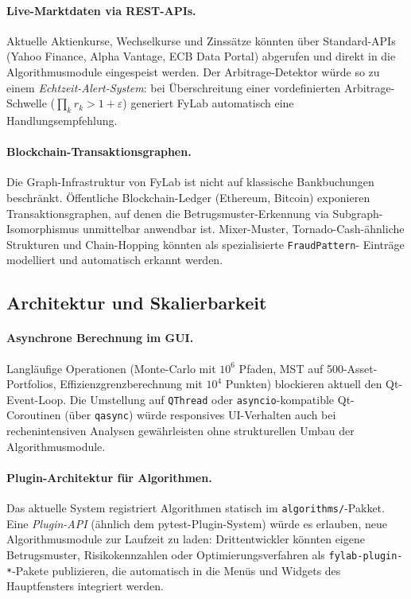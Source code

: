\documentclass[a4paper,12pt]{article}
\begin{document}
\paragraph{Live-Marktdaten via REST-APIs.}
Aktuelle Aktienkurse, Wechselkurse und Zinssätze könnten über
Standard-APIs (Yahoo Finance, Alpha Vantage, ECB Data Portal) abgerufen
und direkt in die Algorithmusmodule eingespeist werden. Der Arbitrage-Detektor
würde so zu einem \emph{Echtzeit-Alert-System}: bei Überschreitung einer
vordefinierten Arbitrage-Schwelle ($\prod_k r_k > 1 + \varepsilon$) generiert
FyLab automatisch eine Handlungsempfehlung.

\paragraph{Blockchain-Transaktionsgraphen.}
Die Graph-Infrastruktur von FyLab ist nicht auf klassische Bankbuchungen
beschränkt. Öffentliche Blockchain-Ledger (Ethereum, Bitcoin) exponieren
Transaktionsgraphen, auf denen die Betrugsmuster-Erkennung via Subgraph-
Isomorphismus unmittelbar anwendbar ist. Mixer-Muster, Tornado-Cash-ähnliche
Strukturen und Chain-Hopping könnten als spezialisierte \texttt{FraudPattern}-
Einträge modelliert und automatisch erkannt werden.

\subsection{Architektur und Skalierbarkeit}
\label{sub:ausblick_arch}

\paragraph{Asynchrone Berechnung im GUI.}
Langläufige Operationen (Monte-Carlo mit $10^6$ Pfaden, MST auf
500-Asset-Portfolios, Effizienzgrenzberechnung mit $10^4$ Punkten)
blockieren aktuell den Qt-Event-Loop. Die Umstellung auf
\texttt{QThread} oder \texttt{asyncio}-kompatible Qt-Coroutinen
(über \texttt{qasync}) würde responsives UI-Verhalten auch bei rechenintensiven
Analysen gewährleisten ohne strukturellen Umbau der Algorithmusmodule.

\paragraph{Plugin-Architektur für Algorithmen.}
Das aktuelle System registriert Algorithmen statisch im \texttt{algorithms/}-Pakket.
Eine \emph{Plugin-API} (ähnlich dem pytest-Plugin-System) würde es erlauben,
neue Algorithmusmodule zur Laufzeit zu laden: Drittentwickler könnten eigene
Betrugsmuster, Risikokennzahlen oder Optimierungsverfahren als
\texttt{fylab-plug\newline in-*}-Pakete publizieren, die automatisch in die Menüs und
Widgets des Hauptfensters integriert werden.
\end{document}
